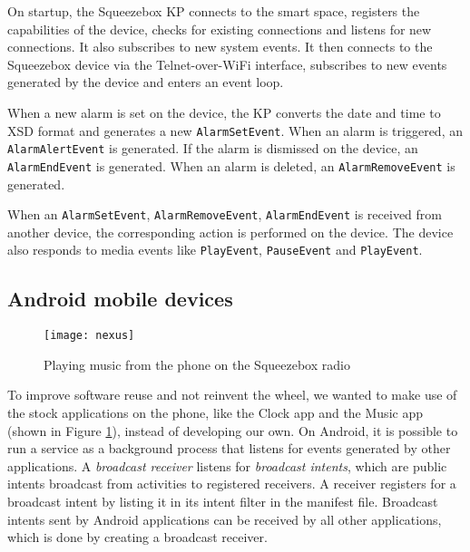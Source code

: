 On startup, the Squeezebox \ac{KP} connects to the smart space, registers the capabilities of the device, checks for existing connections and listens for new connections. It also subscribes to new system events. It then connects to the Squeezebox device via the Telnet-over-WiFi interface, subscribes to new events generated by the device and enters an event loop.


When a new alarm is set on the device, the \ac{KP} converts the date and time to \ac{XSD} format and generates a new \texttt{AlarmSetEvent}. When an alarm is triggered, an \texttt{AlarmAlertEvent} is generated. If the alarm is dismissed on the device, an \texttt{AlarmEndEvent} is generated. When an alarm is deleted, an \texttt{AlarmRemoveEvent} is generated.

When an \texttt{AlarmSetEvent}, \texttt{AlarmRemoveEvent}, \texttt{AlarmEndEvent} is received from another device, the corresponding action is performed on the device. The device also responds to media events like \texttt{PlayEvent}, \texttt{PauseEvent} and \texttt{PlayEvent}.


\subsection{Android mobile devices}

\begin{figure}
\centering
\texttt{[image: nexus]}
\caption{Playing music from the phone on the Squeezebox radio}
\label{nexus}
\end{figure}

To improve software reuse and not reinvent the wheel, we wanted to make use of the stock applications on the phone, like the Clock app and the Music app (shown in Figure \ref{nexus}), instead of developing our own. On Android, it is possible to run a service as a background process that listens for events generated by other applications. A \emph{broadcast receiver} listens for \emph{broadcast intents}, which are public intents broadcast from activities to registered receivers. A receiver registers for a broadcast intent by listing it in its intent filter in the manifest file. Broadcast intents sent by Android applications can be received by all other applications, which is done by creating a broadcast receiver. 

